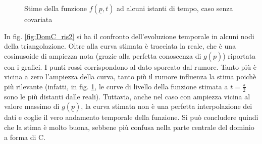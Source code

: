 \documentclass[a4paper,11pt,twoside,openright]{book}							%
\begin{document}
\begin{figure}[H]
{   }
	\caption{Stime della funzione $f(\underline p,t)$ ad alcuni istanti di tempo, caso senza covariata}
	\label{fig:DomC_ris}
\end{figure}

In fig. \ref{fig:DomC_ris2} si ha il confronto dell'evoluzione temporale in alcuni nodi della triangolazione. Oltre alla curva stimata è tracciata la reale, che è una cosinusoide di ampiezza nota (grazie alla perfetta conoscenza di $g(\underline p)$) riportata con i grafici. I punti rossi corrispondono al dato sporcato dal rumore. Tanto più è vicina a zero l'ampiezza della curva, tanto più il rumore influenza la stima poichè più rilevante (infatti, in fig. \ref{fig:DomC_ris}, le curve di livello della funzione stimata a $t=\frac{\pi}{2}$ sono le più distanti dalle reali). Tuttavia, anche nel caso con ampiezza vicina al valore massimo di $g(\underline p)$, la curva stimata non è una perfetta interpolazione dei dati e coglie il vero andamento temporale della funzione. Si può concludere quindi che la stima è molto buona, sebbene più confusa nella parte centrale del dominio a forma di C.
\end{document}
